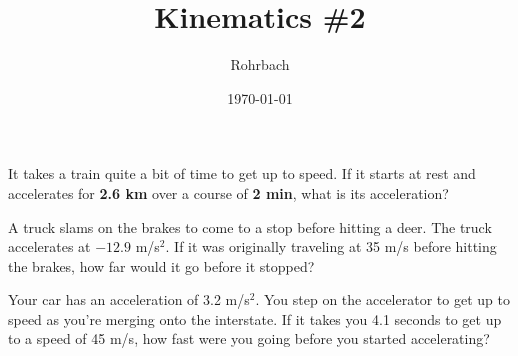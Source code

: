 \documentclass[11pt]{exam}
\title{Kinematics \#2}
\author{Rohrbach}
\date{\today}
\begin{document}
\maketitle

\printeqs

\begin{questions}
  \question  
    It takes a train quite a bit of time to get up to speed.  If it starts at rest and accelerates for \textbf{2.6 km} over a course of \textbf{2 min}, what is its acceleration?
    \vs

  \question
    A truck slams on the brakes to come to a stop before hitting a deer.  The truck accelerates at $-12.9$ m/s$^2$.  If it was originally traveling at 35 m/s before hitting the brakes, how far would it go before it stopped?
    \vs

  \question
    Your car has an acceleration of 3.2 m/s$^2$.  You step on the accelerator to get up to speed as you're merging onto the interstate.  If it takes you 4.1 seconds to get up to a speed of 45 m/s, how fast were you going before you started accelerating?
    \vs

    
  
\end{questions}
\end{document}
